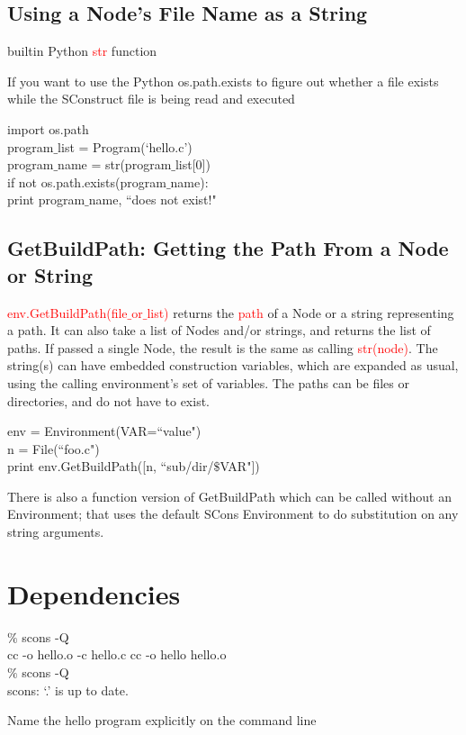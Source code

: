 \documentclass[12pt,a4paper]{article}
\begin{document}
\subsection{Using a Node's File Name as a String}
builtin Python \textcolor{red}{str} function 

If you want to use the Python os.path.exists to figure out whether a file exists while the SConstruct file is being read and executed

import os.path \\
program$\_$list = Program(`hello.c') \\
program$\_$name = str(program$\_$list[0]) \\
if not os.path.exists(program$\_$name): \\
print program$\_$name, ``does not exist!"

\subsection{GetBuildPath: Getting the Path From a Node or String}
\textcolor{red}{env.GetBuildPath(file$\_$or$\_$list)} returns the  \textcolor{red}{path} of a Node or a string representing a path. It can also take a list of Nodes and/or strings, and returns the list of paths. If passed a single Node, the result is the same as calling \textcolor{red}{str(node)}. The string(s) can have embedded construction variables, which are expanded as usual, using the calling environment's set of variables. The paths can be files or directories, and do not have to exist.

env = Environment(VAR=``value") \\
n = File(``foo.c") \\
print env.GetBuildPath([n, ``sub/dir/$\$$VAR"])

There is also a function version of GetBuildPath which can be called without an Environment; that uses the default SCons Environment to do substitution on any string arguments.

\section{Dependencies}

$\%$ scons -Q \\
cc -o hello.o -c hello.c cc -o hello hello.o \\
$\%$ scons -Q \\
scons: `.' is up to date.

Name the hello program explicitly on the command line
\end{document}
